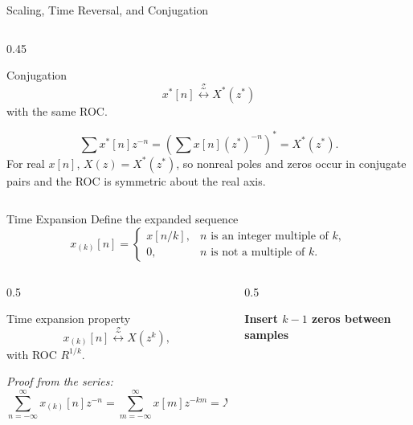 \begin{frame}[t]{Scaling, Time Reversal, and Conjugation}
\begin{columns}[T]
\begin{column}{0.45\textwidth}
      \vspace{0.06cm}
      \begin{conceptbox}{Conjugation}
        \[
          x^*[n]
          \stackrel{\mathcal{Z}}{\longleftrightarrow}
          X^*(z^*)
        \]
        with the same ROC.
      \end{conceptbox}
      {\tiny
        \[
          \sum x^*[n]z^{-n}
          =\left(\sum x[n](z^*)^{-n}\right)^*
          =X^*(z^*).
        \]
      For real $x[n]$, $X(z)=X^*(z^*)$, so nonreal poles and zeros occur in conjugate pairs and the ROC is symmetric about the real axis.}
    \end{column}
  \end{columns}
\end{frame}

\begin{frame}[t]{Time Expansion}
  \small
  Define the expanded sequence
  \[
    x_{(k)}[n]=
    \begin{cases}
      x[n/k], & n \text{ is an integer multiple of } k,\\
      0, & n \text{ is not a multiple of } k.
    \end{cases}
  \]

  \begin{columns}[T]
    \begin{column}{0.5\textwidth}
      \begin{conceptbox}{Time expansion property}
        \[
          x_{(k)}[n]
          \stackrel{\mathcal{Z}}{\longleftrightarrow}
          X(z^k),
        \]
        with ROC $R^{1/k}$.
      \end{conceptbox}

      \textit{Proof from the series:}
      \[
        \sum_{n=-\infty}^{\infty}x_{(k)}[n]z^{-n}
        =
        \sum_{m=-\infty}^{\infty}x[m]z^{-km}
        =
        X(z^k).
      \]
    \end{column}
    \begin{column}{0.5\textwidth}
      \begin{center}
        \textbf{Insert $k-1$ zeros between samples}\\[-0.02cm]


\end{center}
\end{column}
\end{columns}
\end{frame}
